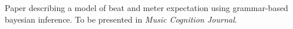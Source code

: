 %


\begin{cvpubs}
\small \color{black}
{Paper describing a model of beat and meter expectation using grammar-based
  bayesian inference.
To be presented in \emph{Music Cognition Journal}.
}

\end{cvpubs}

